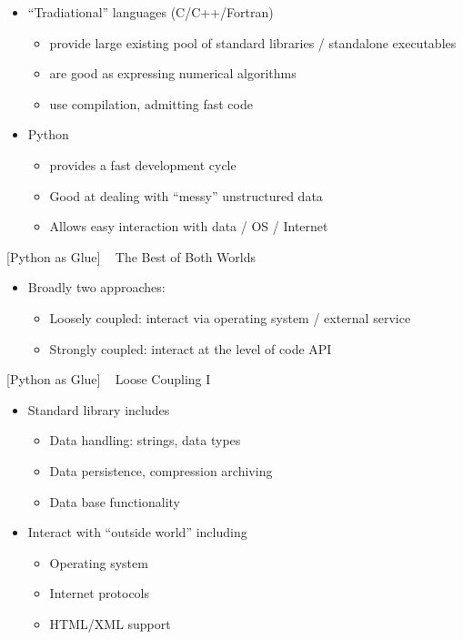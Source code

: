 \documentclass{article}
\begin{document}
\begin{itemize}
\itemsep1pt\parskip0pt
\item
  ``Tradiational'' languages (C/C++/Fortran)

  \begin{itemize}
  \itemsep1pt\parskip0pt
  \item
    provide large existing pool of standard libraries / standalone
    executables
  \item
    are good as expressing numerical algorithms
  \item
    use compilation, admitting fast code
  \end{itemize}
\item
  Python

  \begin{itemize}
  \itemsep1pt\parskip0pt
  \item
    provides a fast development cycle
  \item
    Good at dealing with ``messy'' unstructured data
  \item
    Allows easy interaction with data / OS / Internet
  \end{itemize}
\end{itemize}

    {[}Python as Glue{]} ~ The Best of Both Worlds ~

\begin{itemize}
\item
  Broadly two approaches:

  \begin{itemize}
  \itemsep1pt\parskip0pt
  \item
    Loosely coupled: interact via operating system / external service
  \item
    Strongly coupled: interact at the level of code API
  \end{itemize}
\end{itemize}

    {[}Python as Glue{]} ~ Loose Coupling I

\begin{itemize}
\itemsep1pt\parskip0pt
\item
  Standard library includes

  \begin{itemize}
  \itemsep1pt\parskip0pt
  \item
    Data handling: strings, data types
  \item
    Data persistence, compression archiving
  \item
    Data base functionality
  \end{itemize}
\item
  Interact with ``outside world'' including

  \begin{itemize}
  \itemsep1pt\parskip0pt
  \item
    Operating system
  \item
    Internet protocols
  \item
    HTML/XML support
  \end{itemize}
\end{itemize}
\end{document}
